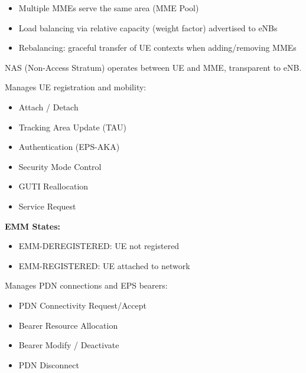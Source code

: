
\begin{itemize}
\tightlist
\item
  Multiple MMEs serve the same area (MME Pool)
\item
  Load balancing via relative capacity (weight factor) advertised to eNBs
\item
  Rebalancing: graceful transfer of UE contexts when adding/\allowbreak{}removing MMEs
\end{itemize}


NAS (Non-Access Stratum) operates between UE and MME, transparent to eNB.


Manages UE registration and mobility:

\begin{itemize}
\tightlist
\item
  Attach /\allowbreak{} Detach
\item
  Tracking Area Update (TAU)
\item
  Authentication (EPS-AKA)
\item
  Security Mode Control
\item
  GUTI Reallocation
\item
  Service Request
\end{itemize}

\textbf{EMM States:}

\begin{itemize}
\tightlist
\item
  EMM-DEREGISTERED: UE not registered
\item
  EMM-REGISTERED: UE attached to network
\end{itemize}


Manages PDN connections and EPS bearers:

\begin{itemize}
\tightlist
\item
  PDN Connectivity Request/\allowbreak{}Accept
\item
  Bearer Resource Allocation
\item
  Bearer Modify /\allowbreak{} Deactivate
\item
  PDN Disconnect
\end{itemize}

